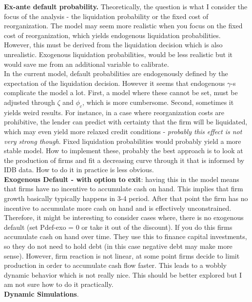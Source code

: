 \documentclass[12pt]{article}
\begin{document}
\textbf{Ex-ante default probability.} Theoretically, the question is what I consider the focus of the analysis - the liquidation probability or the fixed cost of reorganization. The model may seem more realistic when you focus on the fixed cost of reorganization, which yields endogenous liquidation probabilities. However, this must be derived from the liquidation decision which is also unrealistic. Exogenous liquidation probabilities, would be less realistic but it would save me from an additional variable to calibrate. \vspace{3mm} \\
In the current model, default probabilities are endogenously defined by the expectation of the liquidation decision. However it seems that endogenous $\gamma$-s complicate the model a lot. First, a model where these cannot be set, must be adjusted through $\zeta$ and $\phi_c$, which is more cumbersome. Second, sometimes it yields weird results. For instance, in a case where reorganization costs are prohibitive, the lender can predict with certainty that the firm will be liquidated, which may even yield more relaxed credit conditions - \textit{probably this effect is not very strong though}. Fixed liquidation probabilities would probably yield a more stable model.
How to implement these, probably the best approach is to look at the production of firms and fit a decreasing curve through it that is informed by IDB data. How to do it in practice is less obvious. \vspace{3mm} \\
\textbf{Exogenous Default - with option to exit}: having this in the model means that firms have no incentive to accumulate cash on hand. This implies that firm growth basically typically happens in 3-4 period. After that point the firm has no incentive to accumulate more cash on hand and is effectively unconstrained. Therefore, it might be interesting to consider cases where, there is no exogenous default (set Pdef-exo = 0 or take it out of the discount). If you do this firms accumulate cash on hand over time. They use this to finance capital investments, so they do not need to hold debt (in this case negative debt may make more sense). However, firm reaction is not linear, at some point firms decide to limit production in order to accumulate cash flow faster. This leads to a wobbly dynamic behavior which is not really nice. This should be better explored but I am not sure how to do it practically. \vspace{3mm} \\
\textbf{Dynamic Simulations}. \\
\end{document}
